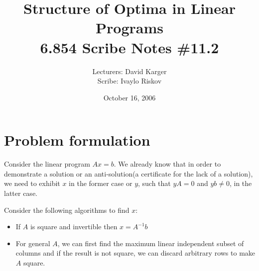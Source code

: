 \documentclass{article}
\begin{document}
\title{Structure of Optima in Linear Programs\\ 6.854 Scribe Notes \#11.2}
\date{October 16, 2006}
\author{Lecturers: David Karger\\ Scribe: Ivaylo Riskov}

%
%
%
%

%



\section{Problem formulation}

Consider the linear program $Ax=b$. We already know that in order
to demonstrate a solution or an anti-solution(a certificate for the lack of a solution), we need to exhibit $x$ in the former case or $y$, such that 
$yA=0$ and $yb \neq 0$, in the latter case.

Consider the following algorithms to find $x$:
\begin{itemize}
\item If $A$ is square and invertible then $x=A^{-1}b$
\item For general $A$, we can first find the maximum linear independent subset of columns  and if the result is not square, we can discard arbitrary rows to make $A$ square.
\end{itemize}
\end{document}

